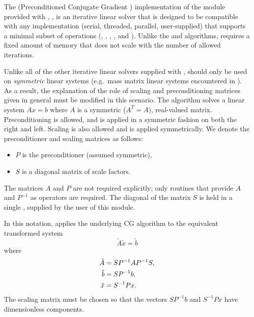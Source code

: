 
The {\pcg} (Preconditioned Conjugate Gradient \cite{HeSt:52})
implementation of the {\sunlinsol} module provided with {\sundials},
{\sunlinsolpcg}, is an iterative linear solver that is designed to be
compatible with any {\nvector} implementation (serial, threaded,
parallel, user-supplied) that supports a minimal subset of operations
(, , , ,
 and ).  Unlike the {\spgmr} and {\spfgmr}
algorithms, {\pcg} requires a fixed amount of memory that does not
scale with the number of allowed iterations.

Unlike all of the other iterative linear solvers supplied with
{\sundials}, {\pcg} should only be used on \emph{symmetric} linear
systems (e.g.~mass matrix linear systems encountered in
{\arkode}). As a result, the explanation of the role of scaling and
preconditioning matrices given in general must be modified in this
scenario.  The {\pcg} algorithm solves a linear system $Ax = b$ where  
$A$ is a symmetric ($A^T=A$), real-valued matrix.  Preconditioning is
allowed, and is applied in a symmetric fashion on both the right and
left.  Scaling is also allowed and is applied symmetrically.  We
denote the preconditioner and scaling matrices as follows:
\begin{itemize}
\item $P$ is the preconditioner (assumed symmetric),
\item $S$ is a diagonal matrix of scale factors.
\end{itemize}
The matrices $A$ and $P$ are not required explicitly; only routines
that provide $A$ and $P^{-1}$ as operators are required.  The diagonal
of the matrix $S$ is held in a single {\nvector}, supplied by the user
of this module.

In this notation, {\pcg} applies the underlying CG algorithm to the
equivalent transformed system 
\begin{equation}
  \label{eq:transformed_linear_systemPCG}
  \tilde{A} \tilde{x} = \tilde{b}
\end{equation}
where
\begin{align}
  \notag
  \tilde{A} &= S P^{-1} A P^{-1} S,\\
  \label{eq:transformed_linear_system_componentsPCG}
  \tilde{b} &= S P^{-1} b,\\
  \notag
  \tilde{x} &= S^{-1} P x.
\end{align} 
The scaling matrix must be chosen so that the vectors $SP^{-1}b$ and
$S^{-1}Px$ have dimensionless components.

